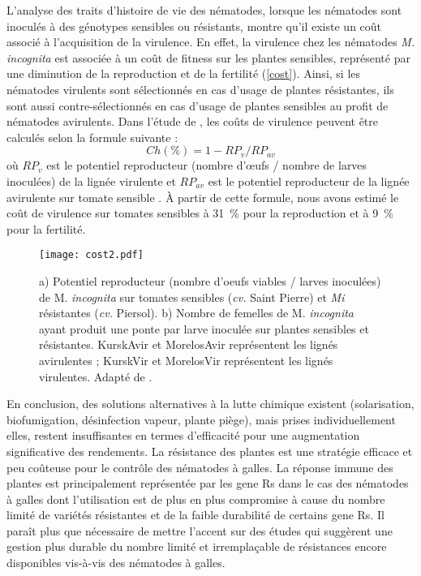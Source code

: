  
	 
	L’analyse des traits d’histoire de vie des nématodes, lorsque les nématodes  sont inoculés à des génotypes sensibles ou résistants, montre qu’il existe un coût  associé à l'acquisition de la virulence. En effet, la virulence chez les nématodes \textit{M. incognita} est  associée à un coût de fitness sur les plantes sensibles, représenté par une diminution de la reproduction et de la fertilité \citep{Castagnone-Sereno2007, Djian-Caporalino2011} (\autoref{cost}). Ainsi, si les nématodes virulents sont sélectionnés en cas d'usage de plantes résistantes, ils sont aussi contre-sélectionnés en cas d'usage de plantes sensibles au profit de nématodes avirulents.
Dans l'étude de  \citet{Castagnone-Sereno2007}, les coûts de virulence peuvent être calculés selon la formule suivante :
\begin{equation}
 Ch(\%) = 1-RP_v/RP_{av} 
 \end{equation}
où $RP_v$ est le potentiel reproducteur  (nombre d’œufs / nombre de larves inoculées) de la lignée virulente et $ RP_{av} $  est le potentiel reproducteur  de la lignée avirulente  sur tomate sensible  \citep{Castagnone-Sereno2007}. 
À partir de cette formule, nous avons estimé le coût de virulence sur tomates sensibles
à 31~\%  pour la reproduction  et  à 9~\% pour la fertilité.

\begin{figure}
	\centering \texttt{[image: cost2.pdf]}
	\caption[a) Potentiel reproducteur et b) fertilité des nématodes \textit{Meloidogyne} \textit{incognita}. ]{ a)  
	 Potentiel reproducteur (nombre d'oeufs viables / larves inoculées) de M. \textit{incognita} sur tomates sensibles  
	 (\textit{cv.} Saint Pierre) et \textit{Mi} résistantes (\textit{cv.} Piersol). b) Nombre de femelles de M. 
	 \textit{ incognita} ayant produit une ponte par larve inoculée  sur plantes sensibles et résistantes. KurskAvir et 
	 MorelosAvir représentent les lignés avirulentes ; KurskVir et MorelosVir représentent les lignés virulentes.   
	 Adapté de \citet{Castagnone-Sereno2007}.}
	\label{cost}
\end{figure}



	
	En conclusion, des solutions alternatives à la lutte chimique existent (solarisation, biofumigation, désinfection vapeur, plante piège), mais prises individuellement elles, restent insuffisantes en termes d’efficacité  pour une augmentation significative des rendements. La résistance des plantes est une stratégie efficace et peu coûteuse pour le contrôle des nématodes à galles. La réponse immune des plantes est principalement représentée par les \glspl{gene R} dans le cas des nématodes à galles  dont l’utilisation est de plus en plus compromise à cause du nombre limité de
variétés résistantes et de la faible durabilité de certains \glspl{gene R}.
Il paraît plus que nécessaire de  mettre l'accent sur des études qui suggèrent une gestion plus durable du nombre limité et irremplaçable de résistances encore disponibles vis-à-vis des nématodes à galles.

